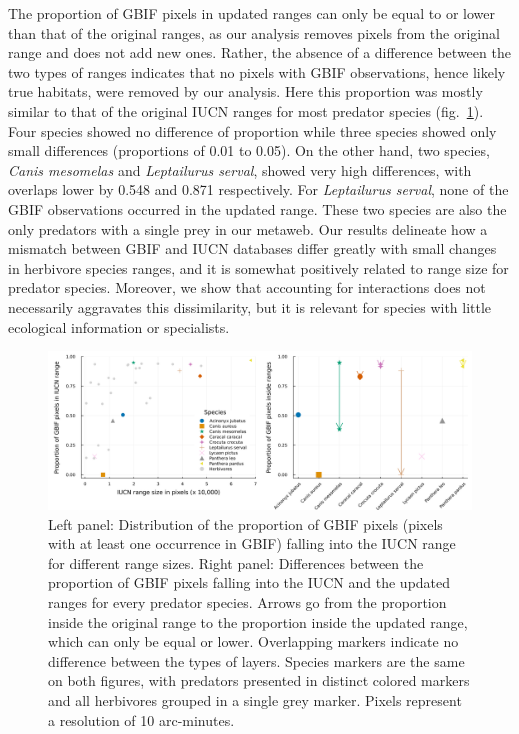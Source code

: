 \documentclass[10pt,oneside]{article}
\makeatletter
\def\maxwidth{\ifdim\Gin@nat@width>\linewidth\linewidth
\else\Gin@nat@width\fi}
\let\Oldincludegraphics\includegraphics
\renewcommand{\includegraphics}[1]{\Oldincludegraphics[width=\maxwidth]{#1}}
\makeatother
\begin{document}
The proportion of GBIF pixels in updated ranges can only be equal to or
lower than that of the original ranges, as our analysis removes pixels
from the original range and does not add new ones. Rather, the absence
of a difference between the two types of ranges indicates that no pixels
with GBIF observations, hence likely true habitats, were removed by our
analysis. Here this proportion was mostly similar to that of the
original IUCN ranges for most predator species (fig.~\ref{fig:gbif}).
Four species showed no difference of proportion while three species
showed only small differences (proportions of 0.01 to 0.05). On the
other hand, two species, \emph{Canis mesomelas} and \emph{Leptailurus
serval}, showed very high differences, with overlaps lower by 0.548 and
0.871 respectively. For \emph{Leptailurus serval}, none of the GBIF
observations occurred in the updated range. These two species are also
the only predators with a single prey in our metaweb. Our results
delineate how a mismatch between GBIF and IUCN databases differ greatly
with small changes in herbivore species ranges, and it is somewhat
positively related to range size for predator species. Moreover, we show
that accounting for interactions does not necessarily aggravates this
dissimilarity, but it is relevant for species with little ecological
information or specialists.

\begin{figure}
\hypertarget{fig:gbif}{%
\centering
\includegraphics{figures/gbif_panels.png}
\caption{Left panel: Distribution of the proportion of GBIF pixels
(pixels with at least one occurrence in GBIF) falling into the IUCN
range for different range sizes. Right panel: Differences between the
proportion of GBIF pixels falling into the IUCN and the updated ranges
for every predator species. Arrows go from the proportion inside the
original range to the proportion inside the updated range, which can
only be equal or lower. Overlapping markers indicate no difference
between the types of layers. Species markers are the same on both
figures, with predators presented in distinct colored markers and all
herbivores grouped in a single grey marker. Pixels represent a
resolution of 10 arc-minutes.}\label{fig:gbif}
}
\end{figure}
\end{document}

